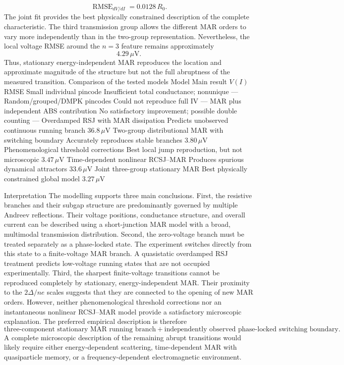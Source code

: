 \[
\operatorname{RMSE}_{dV/dI}
=
0.0128\,R_0.
\]The joint fit provides the best physically constrained description of the complete characteristic. The third transmission group allows the different MAR orders to vary more independently than in the two-group representation.
Nevertheless, the local voltage RMSE around the \(n=3\) feature remains approximately
\[
4.29\,\mu\mathrm V.
\]Thus, stationary energy-independent MAR reproduces the location and approximate magnitude of the structure but not the full abruptness of the measured transition.
Comparison of the tested models
Model	Main result	\(V(I)\) RMSE
Small individual pincode	Insufficient total conductance; nonunique	—
Random/grouped/DMPK pincodes	Could not reproduce full IV	—
MAR plus independent ABS contribution	No satisfactory improvement; possible double counting	—
Overdamped RSJ with MAR dissipation	Predicts unobserved continuous running branch	\(36.8\,\mu\mathrm V\)
Two-group distributional MAR with switching boundary	Accurately reproduces stable branches	\(3.80\,\mu\mathrm V\)
Phenomenological threshold corrections	Best local jump reproduction, but not microscopic	\(3.47\,\mu\mathrm V\)
Time-dependent nonlinear RCSJ–MAR	Produces spurious dynamical attractors	\(33.6\,\mu\mathrm V\)
Joint three-group stationary MAR	Best physically constrained global model	\(3.27\,\mu\mathrm V\)

Interpretation
The modelling supports three main conclusions.
First, the resistive branches and their subgap structure are predominantly governed by multiple Andreev reflections. Their voltage positions, conductance structure, and overall current can be described using a short-junction MAR model with a broad, multimodal transmission distribution.
Second, the zero-voltage branch must be treated separately as a phase-locked state. The experiment switches directly from this state to a finite-voltage MAR branch. A quasistatic overdamped RSJ treatment predicts low-voltage running states that are not occupied experimentally.
Third, the sharpest finite-voltage transitions cannot be reproduced completely by stationary, energy-independent MAR. Their proximity to the \(2\Delta/ne\) scales suggests that they are connected to the opening of new MAR orders. However, neither phenomenological threshold corrections nor an instantaneous nonlinear RCSJ–MAR model provide a satisfactory microscopic explanation.
The preferred empirical description is therefore
\[
\boxed{
\text{three-component stationary MAR running branch}
+
\text{independently observed phase-locked switching boundary}.
}
\]A complete microscopic description of the remaining abrupt transitions would likely require either energy-dependent scattering, time-dependent MAR with quasiparticle memory, or a frequency-dependent electromagnetic environment.